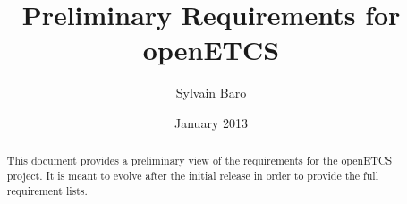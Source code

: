 \documentclass{template/openetcs_article}
\begin{document}
\frontmatter
{}




\title{Preliminary Requirements for openETCS}


\date{January 2013}


\author{Sylvain Baro}
  
  



\begin{abstract}
This document provides a preliminary view of the requirements for the openETCS project. 
It is meant to evolve after the initial release in order to provide the full requirement lists.
\end{abstract}

\maketitle
\tableofcontents
\listoffiguresandtables
\newpage



\newcommand{\tbd}{\colorbox{cyan}{\%\%To Be Defined\%\%}}
\newcommand{\tbc}{\colorbox{cyan}{\%\%To Be Confirmed\%\%}}
\newcommand{\todo}[1]{\colorbox{cyan}{\%\%{#1}\%\%}}
\newlength{\origindent}

\newenvironment{issue}{
	\begin{quote}
	\begin{itshape}Open Issue. 
}{
	\end{itshape}
	\end{quote}
}
\end{document}
